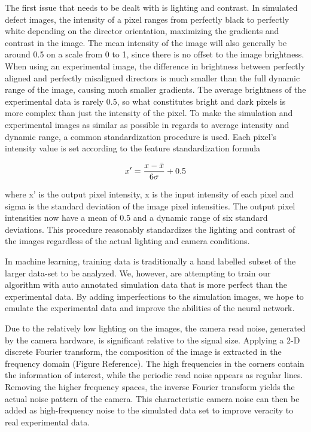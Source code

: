 \documentclass[prl,reprint,showpacs,floatfix,nofootinbib]{revtex4-1}
\begin{document}
The first issue that needs to be dealt with is lighting and contrast. In simulated defect images, the intensity of a pixel ranges from perfectly black to perfectly white depending on the director orientation, maximizing the gradients and contrast in the image. The mean intensity of the image will also generally be around 0.5 on a scale from 0 to 1, since there is no offset to the image brightness. When using an experimental image, the difference in brightness between perfectly aligned and perfectly misaligned directors is much smaller than the full dynamic range of the image, causing much smaller gradients. The average brightness of the experimental data is rarely 0.5, so what constitutes bright and dark pixels is more complex than just the intensity of the pixel. To make the simulation and experimental images as similar as possible in regards to average intensity and dynamic range, a common standardization procedure is used. Each pixel's intensity value is set according to the feature standardization formula 

$$ x' = \frac{x - \Bar{x}}{6\sigma} +0.5 $$

where x' is the output pixel intensity, x is the input intensity of each pixel and sigma is the standard deviation of the image pixel intensities. The output pixel intensities now have a mean of 0.5 and a dynamic range of six standard deviations. This procedure reasonably standardizes the lighting and contrast of the images regardless of the actual lighting and camera conditions.

In machine learning, training data is traditionally a hand labelled subset of the larger data-set to be analyzed. We, however, are attempting to train our algorithm with auto annotated simulation data that is more perfect than the experimental data. By adding imperfections to the simulation images, we hope to emulate the experimental data and improve the abilities of the neural network.

Due to the relatively low lighting on the images, the camera read noise, generated by the camera hardware, is significant relative to the signal size. Applying a 2-D discrete Fourier transform, the composition of the image is extracted in the frequency domain (Figure Reference). The high frequencies in the corners contain the information of interest, while the periodic read noise appears as regular lines. Removing the higher frequency spaces, the inverse Fourier transform yields the actual noise pattern of the camera. This characteristic camera noise can then be added as high-frequency noise to the simulated data set to improve veracity to real experimental data.
\end{document}

